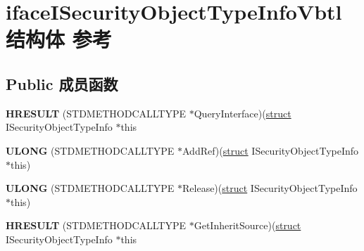 \hypertarget{structiface_i_security_object_type_info_vbtl}{}\section{iface\+I\+Security\+Object\+Type\+Info\+Vbtl结构体 参考}
\label{structiface_i_security_object_type_info_vbtl}
\subsection*{Public 成员函数}
\begin{DoxyCompactItemize}
\item 
\mbox{\label{structiface_i_security_object_type_info_vbtl_a11bc21baab67b46cd06447c7b15889ca}} 
{\bfseries H\+R\+E\+S\+U\+LT} (S\+T\+D\+M\+E\+T\+H\+O\+D\+C\+A\+L\+L\+T\+Y\+PE $\ast$Query\+Interface)(\hyperlink{interfacestruct}{struct} I\+Security\+Object\+Type\+Info $\ast$this
\item 
\mbox{\label{structiface_i_security_object_type_info_vbtl_a23949fc3f3cf7997b846b235e28d2c1a}} 
{\bfseries U\+L\+O\+NG} (S\+T\+D\+M\+E\+T\+H\+O\+D\+C\+A\+L\+L\+T\+Y\+PE $\ast$Add\+Ref)(\hyperlink{interfacestruct}{struct} I\+Security\+Object\+Type\+Info $\ast$this)
\item 
\mbox{\label{structiface_i_security_object_type_info_vbtl_aa74bb6bfba1c6913f1c3f8765f5175ce}} 
{\bfseries U\+L\+O\+NG} (S\+T\+D\+M\+E\+T\+H\+O\+D\+C\+A\+L\+L\+T\+Y\+PE $\ast$Release)(\hyperlink{interfacestruct}{struct} I\+Security\+Object\+Type\+Info $\ast$this)
\item 
\mbox{\label{structiface_i_security_object_type_info_vbtl_af4069f61637c3f3ab74a1e6e99df2651}} 
{\bfseries H\+R\+E\+S\+U\+LT} (S\+T\+D\+M\+E\+T\+H\+O\+D\+C\+A\+L\+L\+T\+Y\+PE $\ast$Get\+Inherit\+Source)(\hyperlink{interfacestruct}{struct} I\+Security\+Object\+Type\+Info $\ast$this
\end{DoxyCompactItemize}
